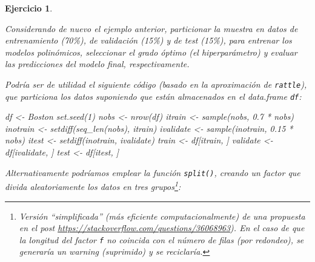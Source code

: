 \documentclass[
]{book}
\newenvironment{Shaded}{\begin{snugshade}}{\end{snugshade}}
\newcommand{\DecValTok}[1]{\textcolor[rgb]{0.00,0.00,0.81}{#1}}
\newcommand{\FloatTok}[1]{\textcolor[rgb]{0.00,0.00,0.81}{#1}}
\newcommand{\FunctionTok}[1]{\textcolor[rgb]{0.00,0.00,0.00}{#1}}
\newcommand{\NormalTok}[1]{#1}
\newcommand{\OtherTok}[1]{\textcolor[rgb]{0.56,0.35,0.01}{#1}}
\newcommand{\SpecialCharTok}[1]{\textcolor[rgb]{0.00,0.00,0.00}{#1}}
\theoremstyle{break}
\newtheorem{exercise}{Ejercicio}[chapter]
\theoremstyle{nonumberplain}
\begin{document}
\begin{exercise}
\protect\hypertarget{exr:train-validate-test}{}\label{exr:train-validate-test}

Considerando de nuevo el ejemplo anterior, particionar la muestra en datos de entrenamiento (70\%), de validación (15\%) y de test (15\%), para entrenar los modelos polinómicos, seleccionar el grado óptimo (el hiperparámetro) y evaluar las predicciones del modelo final, respectivamente.

Podría ser de utilidad el siguiente código (basado en la aproximación de \texttt{rattle}), que particiona los datos suponiendo que están almacenados en el data.frame \texttt{df}:

\begin{Shaded}
\begin{Highlighting}[]
\NormalTok{df }\OtherTok{\textless{}{-}}\NormalTok{ Boston}
\FunctionTok{set.seed}\NormalTok{(}\DecValTok{1}\NormalTok{)}
\NormalTok{nobs }\OtherTok{\textless{}{-}} \FunctionTok{nrow}\NormalTok{(df)}
\NormalTok{itrain }\OtherTok{\textless{}{-}} \FunctionTok{sample}\NormalTok{(nobs, }\FloatTok{0.7} \SpecialCharTok{*}\NormalTok{ nobs)}
\NormalTok{inotrain }\OtherTok{\textless{}{-}} \FunctionTok{setdiff}\NormalTok{(}\FunctionTok{seq\_len}\NormalTok{(nobs), itrain)}
\NormalTok{ivalidate }\OtherTok{\textless{}{-}} \FunctionTok{sample}\NormalTok{(inotrain, }\FloatTok{0.15} \SpecialCharTok{*}\NormalTok{ nobs)}
\NormalTok{itest }\OtherTok{\textless{}{-}} \FunctionTok{setdiff}\NormalTok{(inotrain, ivalidate)}
\NormalTok{train }\OtherTok{\textless{}{-}}\NormalTok{ df[itrain, ]}
\NormalTok{validate }\OtherTok{\textless{}{-}}\NormalTok{ df[ivalidate, ]}
\NormalTok{test }\OtherTok{\textless{}{-}}\NormalTok{ df[itest, ]}
\end{Highlighting}
\end{Shaded}

Alternativamente podríamos emplear la función \texttt{split()}, creando un factor que divida aleatoriamente los datos en tres grupos\footnote{Versión ``simplificada'' (más eficiente computacionalmente) de una propuesta en el post \href{https://stackoverflow.com/questions/36068963/r-how-to-split-a-data-frame-into-training-validation-and-test-sets}{https://stackoverflow.com/questions/36068963}). En el caso de que la longitud del factor \texttt{f} no coincida con el número de filas (por redondeo), se generaría un \emph{warning} (suprimido) y se reciclaría.}:


\end{exercise}
\end{document}
